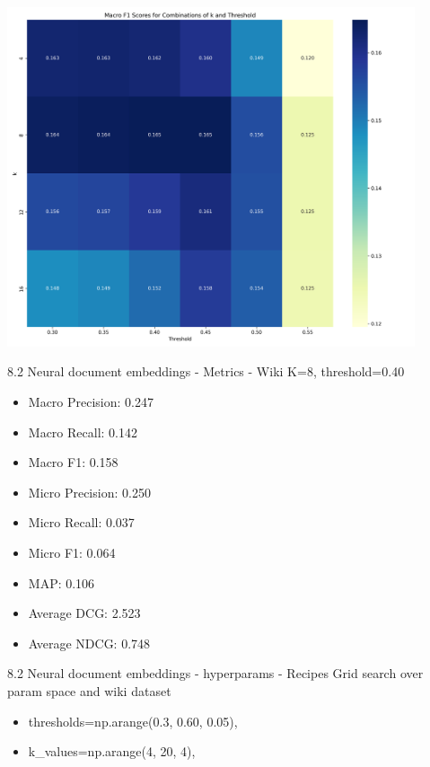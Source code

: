 \documentclass{beamer}
\begin{document}
\begin{frame}
  \centering
  \includegraphics[width=0.9\textwidth]{wiki_embeddings_heatmap.png_1747347453.png}
\end{frame}


\begin{frame}{8.2 Neural document embeddings - Metrics - Wiki}
  K=8, threshold=0.40
  \begin{itemize}
    \item Macro Precision: 0.247
    \item Macro Recall: 0.142
    \item Macro F1: 0.158
    \item Micro Precision: 0.250
    \item Micro Recall: 0.037
    \item Micro F1: 0.064
    \item MAP: 0.106
    \item Average DCG: 2.523
    \item Average NDCG: 0.748
  \end{itemize}
\end{frame}

\begin{frame}{8.2 Neural document embeddings - hyperparams - Recipes}
  Grid search over param space and wiki dataset
  \begin{itemize}
    \item thresholds=np.arange(0.3, 0.60, 0.05),
    \item k\_values=np.arange(4, 20, 4),
  \end{itemize}
\end{frame}
\end{document}

